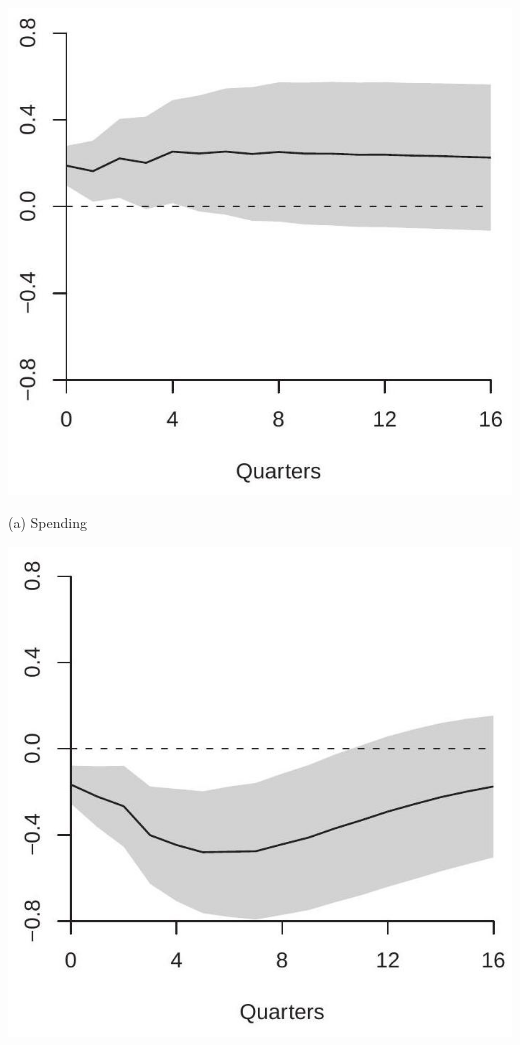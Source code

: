 \documentclass[10pt]{article}
\begin{document}
\includegraphics[max width=\textwidth]{2022_10_23_7c0e31a459390f548ae3g-25}

(a) Spending

\includegraphics[max width=\textwidth]{2022_10_23_7c0e31a459390f548ae3g-25(1)}
\end{document}
